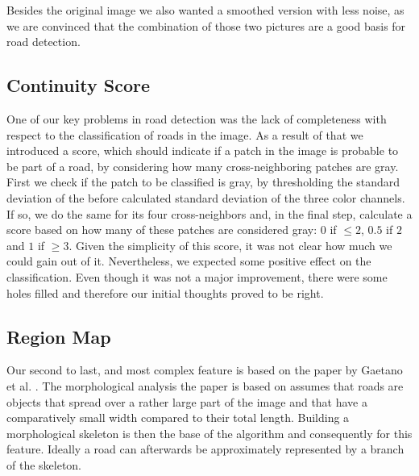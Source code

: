 \documentclass[10pt,conference,compsocconf]{IEEEtran}
\begin{document}
Besides the original image we also wanted a smoothed version with less noise, as we are convinced that the combination of those two pictures are a good basis for road detection.

\subsection{Continuity Score}

One of our key problems in road detection was the lack of completeness with respect to the classification of roads in the image. As a result of that we introduced a score, which should indicate if a patch in the image is probable to be part of a road, by considering how many cross-neighboring patches are gray. First we check if the patch to be classified is gray, by thresholding the standard deviation of the before calculated standard deviation of the three color channels. If so, we do the same for its four cross-neighbors and, in the final step, calculate a score based on how many of these patches are considered gray: $0$ if $\leq2$, $0.5$ if $2$ and $1$ if $\geq3$.
Given the simplicity of this score, it was not clear how much we could gain out of it. Nevertheless, we expected some positive effect on the classification. Even though it was not a major improvement, there were some holes filled and therefore our initial thoughts proved to be right.

\subsection{Region Map}
Our second to last, and most complex feature is based on the paper by Gaetano et al. \cite{GaZeScPo11}. The morphological analysis the paper is based on assumes that roads are objects that spread over a rather large part of the image and that have a comparatively small width compared to their total length. Building a morphological skeleton is then the base of the algorithm and consequently for this feature. Ideally a road can afterwards be approximately represented by a branch of the skeleton.
\end{document}
